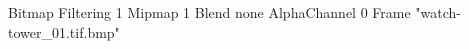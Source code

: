 {Bitmap
	{Filtering 1}
	{Mipmap 1}
	{Blend none}
	{AlphaChannel 0}
	{Frame "watch-tower_01.tif.bmp"}
}
